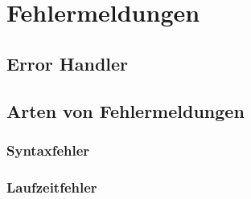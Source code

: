\section{Fehlermeldungen}
\subsection{Error Handler}
\subsection{Arten von Fehlermeldungen}
\subsubsection{Syntaxfehler}
\subsubsection{Laufzeitfehler}
